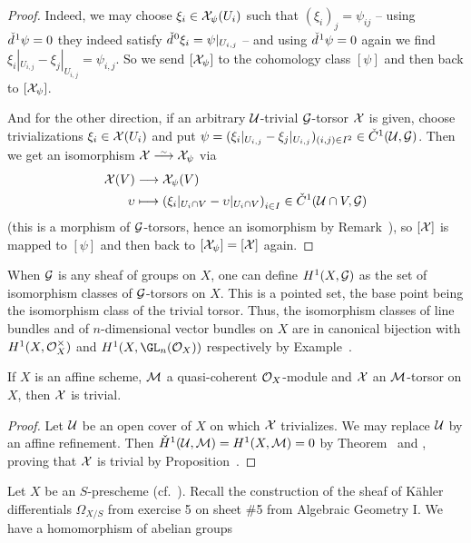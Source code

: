 \documentclass[a4paper,parskip=half,numbers=enddot, DIV=12]{scrreprt}
\begin{document}
\begin{proof}
	Indeed, we may choose $\xi_i\in\mathcal{X}_\psi(U_i)$ such that $(\xi_i)_j=\psi_{ij}$ -- using $\check{d}\hspace{0.06125em}^1\psi=0$ they indeed satisfy $\check{d}\hspace{0.06125em}^0\xi_i=\psi|_{U_{i,j}}$ -- and using $\check{d}\hspace{0.06125em}^1\psi=0$ again we find $\xi_i|_{U_{i,j}}-\xi_j|_{U_{i,j}}=\psi_{i,j}$. So we send $[\mathcal{X}_\psi]$ to the cohomology class $[\psi]$ and then back to $[\mathcal{X}_\psi]$.
	
	And for the other direction, if an arbitrary $\mathcal{U}$-trivial $\mathcal{G}$-torsor $\mathcal{X}$ is given, choose trivializations $\xi_i\in\mathcal{X}(U_i)$ and put $\psi=(\xi_i|_{U_{i,j}}-\xi_j|_{U_{i,j}})_{(i,j)\in I^2}\in\check{C}^1(\mathcal{U},\mathcal{G})$. Then we get an isomorphism $\Xx\isomorphism\Xx_\psi$ via
	\begin{align*}
		\Xx(V)&\morphism \Xx_\psi(V)\\
		\upsilon &\longmapsto \left(\xi_i|_{U_i\cap V}-\upsilon|_{U_i\cap V}\right)_{i\in I}\in\check{C}^1(\Uu\cap V,\Gg)
	\end{align*}
	(this is a morphism of $\mathcal{G}$-torsors, hence an isomorphism by Remark~), so $[\mathcal{X}]$ is mapped to $[\psi]$ and then back to $[\mathcal{X}_\psi]=[\mathcal{X}]$ again.
\end{proof}
\begin{rem*}
	When $\mathcal{G}$ is any sheaf of groups on $X$, one can define $H^1(X,\mathcal{G})$ as the set of isomorphism classes of $\mathcal{G}$-torsors on $X$. This is a pointed set, the base point being the isomorphism class of the trivial torsor. Thus, the isomorphism classes of line bundles and of $n$-dimensional vector bundles on $X$ are in canonical bijection with $H^1(X,\mathcal{O}_X^\times)$ and $H^1(X,\GL_n(\Oo_X))$ respectively by Example~.
\end{rem*}
\begin{cor}
	If $X$ is an affine scheme, $\mathcal{M}$ a quasi-coherent $\mathcal{O}_X$-module and $\mathcal{X}$ an $\mathcal{M}$-torsor on $X$, then $\mathcal{X}$ is trivial.
\end{cor}
\begin{proof}
	Let $\mathcal{U}$ be an open cover of $X$ on which $\mathcal{X}$ trivializes. We may replace $\mathcal{U}$ by an affine refinement. Then $\check{H}^1(\mathcal{U},\mathcal{M})=H^1(X,\mathcal{M})=0$ by Theorem~ and , proving that $\mathcal{X}$ is trivial by Proposition~.
\end{proof}
Let $X$ be an $S$-prescheme (cf.\ \cite[Definition~1.5.7]{alggeo1}). Recall the construction of the sheaf of Kähler differentials $\Omega_{X/S}$ from exercise 5 on sheet \#5 from Algebraic Geometry I. We have a homomorphism of abelian groups
\end{document}
